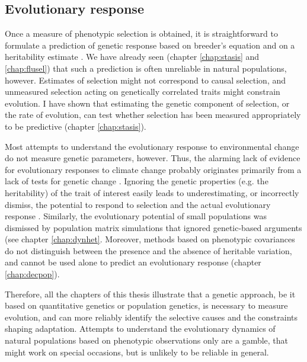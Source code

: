 \subsection{Evolutionary response}
Once a measure of phenotypic selection is obtained, it is straightforward to formulate a prediction of genetic response based on breeder's equation and on a heritability estimate \parencite{Lush1937}. We have already seen (chapter \ref{chap:stasis} and \ref{chap:flusel}) that such a prediction is often unreliable in natural populations, however.  Estimates of selection might not correspond to causal selection, and unmeasured selection acting on genetically correlated traits might constrain evolution. I have shown that estimating the genetic component of selection, or the rate of evolution, can test whether selection has been measured appropriately to be predictive (chapter \ref{chap:stasis}). 

Most attempts to understand the evolutionary response to environmental change do not measure genetic parameters, however. Thus, the alarming lack of evidence for evolutionary responses to climate change probably originates primarily from a lack of tests for genetic change \cite{Charmantier2014,Gienapp2014,Merila2014,Crozier2014}.
Ignoring the genetic properties (e.g. the heritability) of the trait of interest \parencite[e.g.][]{Forcada2014, Coulson2014, traill2014demography} easily leads to underestimating, or incorrectly dismiss, the potential to respond to selection and the actual evolutionary response \parencite{Nietlisbach2015, Chevin2015a, Pigeon2016}.
Similarly, the evolutionary potential of small populations was dismissed by population matrix simulations that ignored genetic-based arguments (see chapter \ref{chap:dynhet}. Moreover, methods based on phenotypic covariances do not distinguish between the presence and the absence of heritable variation, and cannot be used alone to predict an evolutionary response (chapter \ref{chap:decpop}).

Therefore, all the chapters of this thesis illustrate that a genetic approach, be it based on quantitative genetics or population genetics, is necessary to measure evolution, and can more reliably identify the selective causes and the constraints shaping adaptation. 
Attempts to understand the evolutionary dynamics of natural populations based on phenotypic observations only \parencite[e.g.][]{Smallegange2013} are a gamble, that might work on special occasions, but is unlikely to be reliable in general. 

